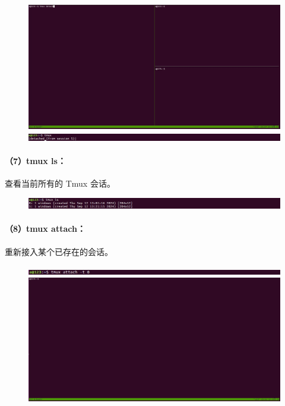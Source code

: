 \documentclass[a4paper, 12pt]{article}
\begin{document}
	\begin{figure}[H]
		\centering
		\includegraphics[width=1\textwidth]{018.jpg}
		\includegraphics[width=1\textwidth]{019.jpg}
	\end{figure}
	
	\paragraph{（7）tmux ls：}
	查看当前所有的 Tmux 会话。
	
	\begin{figure}[H]
		\centering
		\includegraphics[width=1\textwidth]{020.jpg}
	\end{figure}
	
	\paragraph{（8）tmux attach：}
	重新接入某个已存在的会话。	
	
	\begin{figure}[H]
		\centering
		\includegraphics[width=1\textwidth]{021.jpg}
		\includegraphics[width=1\textwidth]{022.jpg}
	\end{figure}
	
\end{document}

